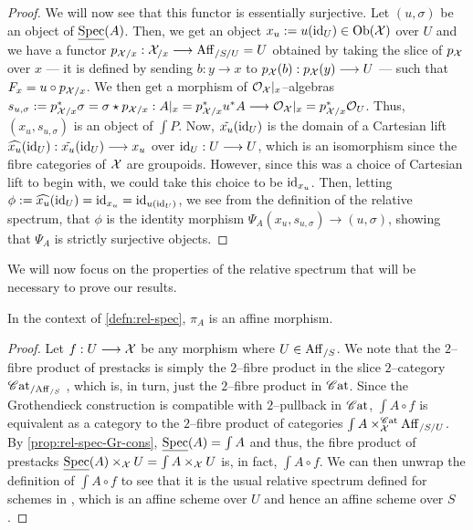 \documentclass[11pt]{amsart}
\begin{document}
\begin{proof}
We will now see that this functor is essentially surjective.
Let $(u, \sigma)$ be an object of $\underline{\mathrm{Spec}}(A)$.
Then, we get an object
$x_u := u(\id_U) \in \Ob{\mcX}$ over $U$ and we have a functor
$p_{\mcX/x} : \mcX_{/x} \to \Aff_{/S/U} = U$ obtained by taking the slice of
$p_\mathcal{X}$ over $x$ --- it is defined by sending
$b : y \to x$ to $p_\mcX(b) : p_\mcX(y) \to U$ --- such that
$F_x = u \circ p_{\mathcal{X}/x}$. We then get a morphism of $\mathcal{O}_{\mathcal{X}}|_x$--algebras
$s_{u, \sigma} := p_{\mcX/x}^*\sigma = \sigma \star p_{\mcX/x} :
A|_x = p_{\mcX/x}^*u^*A \to \mcO_\mcX|_x = p_{\mcX/x}^*\mcO_U$.
Thus, $(x_u, s_{u, \sigma})$ is an object of $\int P$.
Now, $\tilde{x_u}(\mathrm{id}_U)$ is the domain of a Cartesian lift
$\wh{x_u}(\id_U) : \tilde{x_u}(\id_U) \to x_u$ over $\id_U : U \to U$,
which is an isomorphism since the fibre categories of $\mathcal{X}$ are groupoids.
However, since this was a choice of Cartesian lift to begin with, we could take
this choice to be $\mathrm{id}_{x_u}$. Then, letting
$\phi := \widehat{x_u}(\mathrm{id}_U) = \mathrm{id}_{x_u} = \mathrm{id}_{u(\mathrm{id}_U)}$, we see from the
definition of the relative spectrum, that $\phi$ is the identity morphism
$\Psi_A(x_u, s_{u, \sigma}) \to (u, \sigma)$, showing that
$\Psi_A$ is strictly surjective objects.
\end{proof}

We will now focus on the properties of the relative spectrum that will be
necessary to prove our results.

\begin{prop}\label{prop:vec-bun-proj-affine}
In the context of \cref{defn:rel-spec}, $\pi_A$ is an affine morphism.
\end{prop}
\begin{proof}
Let $f : U \to \mcX$ be any morphism where $U \in \mathrm{Aff}_{/S}$.
We note that the $2$--fibre
product of prestacks is simply the $2$--fibre product in the slice $2$--category
$\mathscr{C}\mathrm{at}_{/\mathrm{Aff}_{/S}}$
\cite[\href{https://stacks.math.columbia.edu/tag/0041}{Lemma 0041}]
{stacks-project}, which is, in turn, just the $2$--fibre product in $\mathscr{C}\mathrm{at}$.
Since the Grothendieck construction is compatible with $2$--pullback in $\mathscr{C}\mathrm{at}$,
$\int A \circ f$ is equivalent as a category to the $2$--fibre product
of categories $\int A \times^{\mathscr{C}\mathrm{at}}_\mathcal{X} \mathrm{Aff}_{/S/U}$.
By \cref{prop:rel-spec-Gr-cons}, $\underline{\mathrm{Spec}}(A) = \int A$ and thus, the fibre
product of prestacks $\underline{\mathrm{Spec}}(A) \times_\mathcal{X} U = \int A \times_\mathcal{X} U$
is, in fact, $\int A \circ f$. We can then unwrap the definition of
$\int A \circ f$ to see that it is the usual relative spectrum defined for
schemes in
\cite[\href{https://stacks.math.columbia.edu/tag/01LQ}{Section 01LQ}]
{stacks-project}, which is an affine scheme over $U$ and hence an affine scheme
over $S$.
\end{proof}
\end{document}
